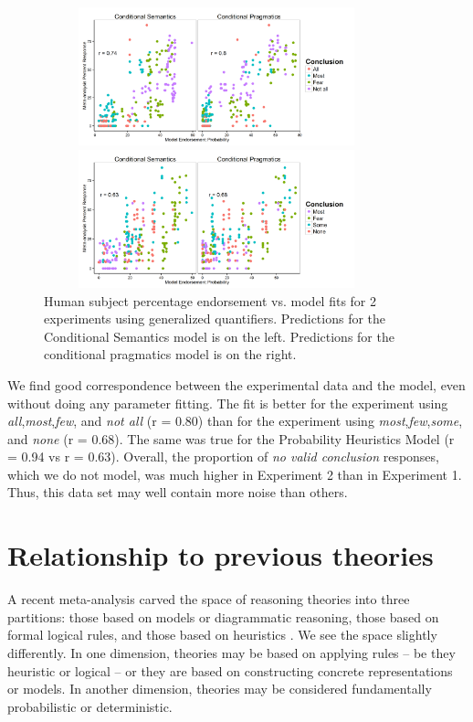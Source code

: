 \documentclass[10pt,letterpaper]{article}
\begin{document}
\begin{figure}[ht]
	\centering
	\subfigure

  \includegraphics[width=10cm,height=4cm]{multiScatter_AMFO_n6_alphabefore1}

  \label{fig:amfoScatter}
\subfigure
	\centering
    \includegraphics[width=10cm,height=4cm]{multiScatter_MFIE_n6_alphabefore1}
      \caption{Human subject percentage endorsement vs. model fits for 2 experiments using generalized quantifiers. Predictions for the Conditional Semantics model is on the left. Predictions for the conditional pragmatics model is on the right.}
  \label{fig:mfieScatter}
\end{figure}


We find good correspondence between the experimental data and the model, even without doing any parameter fitting. The fit is better for the experiment using \emph{all},\emph{most},\emph{few}, and \emph{not all} (r = 0.80) than for the experiment using \emph{most},\emph{few},\emph{some}, and \emph{none} (r = 0.68). The same was true for the Probability Heuristics Model (r = 0.94 vs r = 0.63). Overall, the proportion of \emph{no valid conclusion} responses, which we do not model, was much higher in Experiment 2 than in Experiment 1. Thus, this data set may well contain more noise than others. 




\section{Relationship to previous theories}

A recent meta-analysis carved the space of reasoning theories into three partitions: those based on models or diagrammatic reasoning, those based on formal logical rules, and those based on heuristics \cite{Khemlani2012}. We see the space slightly differently. In one dimension, theories may be based on applying rules -- be they heuristic or logical -- or they are based on constructing concrete representations or models. In another dimension, theories may be considered fundamentally probabilistic or deterministic. 
\end{document}
